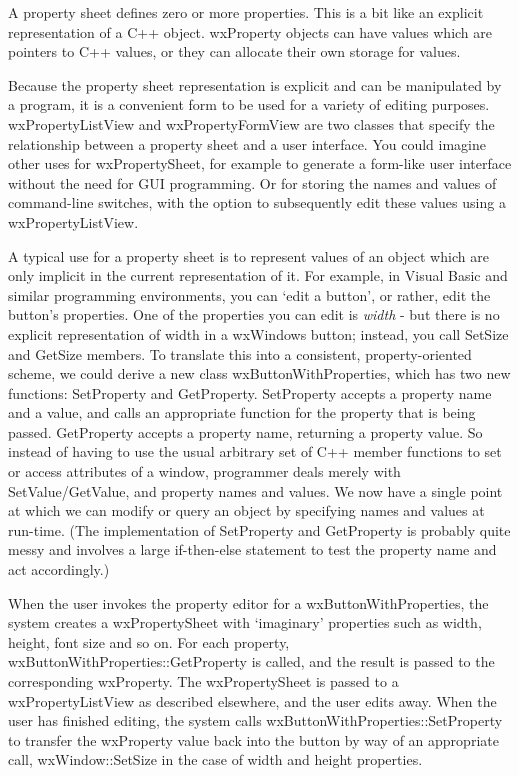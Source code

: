 A property sheet defines zero or more properties. This is a bit like an explicit representation of
a C++ object. wxProperty objects can have values which are pointers to C++ values, or they
can allocate their own storage for values.

Because the property sheet representation is explicit and can be manipulated by
a program, it is a convenient form to be used for a variety of
editing purposes. wxPropertyListView and wxPropertyFormView are two classes that
specify the relationship between a property sheet and a user interface. You could imagine
other uses for wxPropertySheet, for example to generate a form-like user interface without
the need for GUI programming. Or for storing the names and values of command-line switches, with the
option to subsequently edit these values using a wxPropertyListView.

A typical use for a property sheet is to represent values of an object
which are only implicit in the current representation of it. For
example, in Visual Basic and similar programming environments, you can
`edit a button', or rather, edit the button's properties.  One of the
properties you can edit is {\it width} - but there is no explicit
representation of width in a wxWindows button; instead, you call SetSize
and GetSize members. To translate this into a consistent,
property-oriented scheme, we could derive a new class
wxButtonWithProperties, which has two new functions: SetProperty and
GetProperty.  SetProperty accepts a property name and a value, and calls
an appropriate function for the property that is being passed.
GetProperty accepts a property name, returning a property value. So
instead of having to use the usual arbitrary set of C++ member functions
to set or access attributes of a window, programmer deals merely with
SetValue/GetValue, and property names and values.
We now have a single point at which we can modify or query an object by specifying
names and values at run-time. (The implementation of SetProperty and GetProperty
is probably quite messy and involves a large if-then-else statement to
test the property name and act accordingly.)

When the user invokes the property editor for a wxButtonWithProperties, the system
creates a wxPropertySheet with `imaginary' properties such as width, height, font size
and so on. For each property, wxButtonWithProperties::GetProperty is called, and the result is
passed to the corresponding wxProperty. The wxPropertySheet is passed to a wxPropertyListView
as described elsewhere, and the user edits away. When the user has finished editing, the system calls
wxButtonWithProperties::SetProperty to transfer the wxProperty value back into the button
by way of an appropriate call, wxWindow::SetSize in the case of width and height properties.

